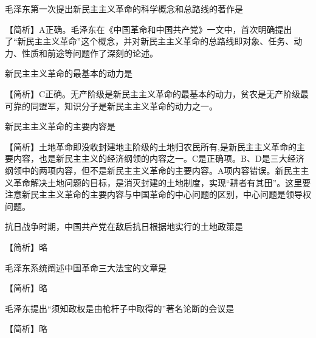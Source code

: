 \question 毛泽东第一次提出新民主主义革命的科学概念和总路线的著作是
\par{}
\begin{solution}【简析】A正确。毛泽东在《中国革命和中国共产党》一文中，首次明确提出了``新民主主义革命''这个概念，并对新民主主义革命的总路线即对象、任务、动力、性质和前途等问题作了深刻的论述。
\end{solution}
\question 新民主主义革命的最基本的动力是
\par{}
\begin{solution}【简析】C正确。无产阶级是新民主主义革命的最基本的动力，贫农是无产阶级最可靠的同盟军，知识分子是新民主主义革命的动力之一。
\end{solution}
\question 新民主主义革命的主要内容是
\par{}
\begin{solution}【简析】土地革命即没收封建地主阶级的土地归农民所有,是新民主主义革命的主要内容，也是新民主主义的经济纲领的内容之一。C是正确项。B、D是三大经济纲领中的两项内容，但不是新民主主义革命的主要内容。A项内容错误。新民主主义革命解决土地问题的目标，是消灭封建的土地制度，实现``耕者有其田''。这里要注意新民主主义革命的主要内容与中国革命的中心问题的区别，中心问题是领导权问题。
\end{solution}
\question 抗日战争时期，中国共产党在敌后抗日根据地实行的土地政策是
\par{}
\begin{solution}【简析】略
\end{solution}
\question 毛泽东系统阐述中国革命三大法宝的文章是
\par{}
\begin{solution}【简析】略
\end{solution}
\question 毛泽东提出``须知政权是由枪杆子中取得的''著名论断的会议是
\par{}
\begin{solution}【简析】略
\end{solution}
